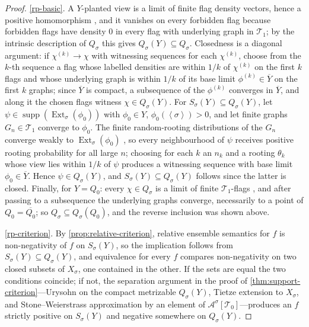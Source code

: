 \documentclass[11pt]{article}
\theoremstyle{definition}
\newcommand{\A}{\mathcal{A}}
\newcommand{\T}{\mathcal{T}}
\newcommand{\Ext}{\operatorname{Ext}}
\newcommand{\supp}{\operatorname{supp}}
\newcommand{\brak}[1]{\left\langle #1\right\rangle}
\begin{document}
\begin{proof}
\ref{rp-basic}.  A $Y$-planted view is a limit of finite flag density vectors, hence a
positive homomorphism \cite[Theorem 3.3]{Razborov2007}, and it vanishes on every
forbidden flag because forbidden flags have density $0$ in every flag with underlying
graph in $\T_1$; by the intrinsic description of $Q_\sigma$ this gives
$Q_\sigma(Y)\subseteq Q_\sigma$.  Closedness is a diagonal argument: if
$\chi^{(k)}\to\chi$ with witnessing sequences for each $\chi^{(k)}$, choose from the
$k$-th sequence a flag whose labelled densities are within $1/k$ of $\chi^{(k)}$ on the
first $k$ flags and whose underlying graph is within $1/k$ of its base limit
$\phi^{(k)}\in\overline Y$ on the first $k$ graphs; since $\overline Y$ is compact, a
subsequence of the $\phi^{(k)}$ converges in $\overline Y$, and along it the chosen
flags witness $\chi\in Q_\sigma(Y)$.  For $S_\sigma(Y)\subseteq Q_\sigma(Y)$, let
$\psi\in\supp(\Ext_\sigma(\phi_0))$ with $\phi_0\in Y$, $\phi_0(\brak\sigma)>0$, and
let finite graphs $G_n\in\T_1$ converge to $\phi_0$.  The finite random-rooting
distributions of the $G_n$ converge weakly to $\Ext_\sigma(\phi_0)$
\cite[Theorems 3.5 and 3.12]{Razborov2007}, so every neighbourhood of $\psi$ receives
positive rooting probability for all large $n$; choosing for each $k$ an $n_k$ and a
rooting $\theta_k$ whose view lies within $1/k$ of $\psi$ produces a witnessing
sequence with base limit $\phi_0\in\overline Y$.  Hence
$\psi\in Q_\sigma(Y)$, and $S_\sigma(Y)\subseteq Q_\sigma(Y)$ follows since the latter
is closed.  Finally, for $Y=Q_0$: every $\chi\in Q_\sigma$ is a limit of finite
$\T_1$-flags \cite[Theorem 3.3]{Razborov2007}, and after passing to a subsequence the
underlying graphs converge, necessarily to a point of $Q_0=\overline{Q_0}$; so
$Q_\sigma\subseteq Q_\sigma(Q_0)$, and the reverse inclusion was shown above.

\ref{rp-criterion}.  By \cref{prop:relative-criterion}, relative ensemble semantics for
$f$ is non-negativity of $f$ on $S_\sigma(Y)$, so the implication follows from
$S_\sigma(Y)\subseteq Q_\sigma(Y)$, and equivalence for every $f$ compares
non-negativity on two closed subsets of $X_\sigma$, one contained in the other.  If the
sets are equal the two conditions coincide; if not, the separation argument in the
proof of \cref{thm:support-criterion}---Urysohn on the compact metrizable
$Q_\sigma(Y)$, Tietze extension to $X_\sigma$, and Stone--Weierstrass
approximation by an element of $\A^\sigma[\T_0]$---produces an $f$ strictly positive
on $S_\sigma(Y)$ and negative somewhere on $Q_\sigma(Y)$.
\end{proof}
\end{document}
